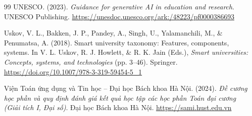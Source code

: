 \begin{thebibliography}{99}
UNESCO. (2023). \textit{Guidance for generative AI in education and research}. UNESCO Publishing. \url{https://unesdoc.unesco.org/ark:/48223/pf0000386693}

Uskov, V. L., Bakken, J. P., Pandey, A., Singh, U., Yalamanchili, M., \& Penumatsa, A. (2018). Smart university taxonomy: Features, components, systems. In V. L. Uskov, R. J. Howlett, \& R. K. Jain (Eds.), \textit{Smart universities: Concepts, systems, and technologies} (pp. 3--46). Springer. \url{https://doi.org/10.1007/978-3-319-59454-5_1}

Viện Toán ứng dụng và Tin học -- Đại học Bách khoa Hà Nội. (2024). \textit{Đề cương học phần và quy định đánh giá kết quả học tập các học phần Toán đại cương (Giải tích I, Đại số)}. Đại học Bách khoa Hà Nội. \url{https://sami.hust.edu.vn}

\end{thebibliography}
